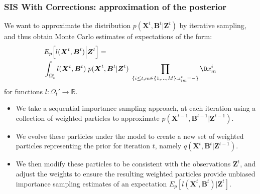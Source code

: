 \documentclass[9pt, xcolor={dvipsnames,svgnames,table}]{beamer}
\newcommand{\Real}{\mathbb R}
\begin{document}
\begin{frame}
    \frametitle{SIS With Corrections: approximation of the posterior}
    We want to approximate the distribution $p(\bm{X}^{t}, \bm{B}^{t} | \bm{Z}^{t})$ by iterative sampling, and thus obtain Monte Carlo estimates of expectations of the form:
    \begin{align*}
        &E_{p} \Big[l(\bm{X}^{t}, \bm{B}^{t} ) \Big| \bm{Z}^{t} \Big] = \\
        &\int_{\Omega_t'} l(\bm{X}^{t}, \bm{B}^{t})\; p(\bm{X}^{t}, \bm{B}^{t} | \bm{Z}^{t})\; \prod_{ \{ i \leq t, m \in \{1, \ldots, M \} : z^t_{im} = - \} } \D x^i_m
    \end{align*}
    for functions $l: \Omega_t' \rightarrow \Real$. 
    \begin{itemize}
        \item We take a sequential importance sampling approach, at each iteration using a collection of weighted particles to approximate $p(\bm{X}^{t-1}, \bm{B}^{t-1} | \bm{Z}^{t-1})$.
        \item We evolve these particles under the model to create a new set of weighted particles representing the prior for iteration $t$, namely $q(\bm{X}^{t}, \bm{B}^{t} | \bm{Z}^{t-1})$.
        \item We then modify these particles to be consistent with the observations $\bm{Z}^{t}$, and adjust the weights to ensure the resulting weighted particles provide unbiased importance sampling estimates of an expectation $E_{p}[l(\bm{X}^{t}, \bm{B}^t) | \bm{Z}^t]$.
    \end{itemize}
\end{frame}
\end{document}
